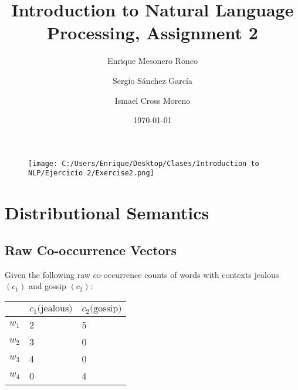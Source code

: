 \documentclass{article}
\title{ Introduction to Natural Language Processing, Assignment 2 }
\author{ Enrique Mesonero Ronco \and Sergio Sánchez García \and Ismael Cross Moreno }
\date{\today}
\begin{document}
\maketitle
\begin{figure}[h!]
	\texttt{[image: C:/Users/Enrique/Desktop/Clases/Introduction to NLP/Ejercicio 2/Exercise2.png]}
\end{figure}
\newpage
\tableofcontents
\newpage
\section { Distributional Semantics }
	\subsection { Raw Co-occurrence Vectors }
Given the following raw co-occurrence counts of words with contexts jealous
$(c_1)$ and gossip $(c_2)$:

	\begin{center}
	\begin{tabular} { | m{2cm} | m{2cm} | m{2cm} | }
		\hline
		 & $c_1 \text{(jealous)}$ &  $c_2 \text{(gossip)} $\\
		\hline
		$w_1$ & 2 & 5 \\
		\hline
		$w_2$ & 3 & 0 \\
		\hline
		$w_3$ & 4 & 0 \\
		\hline
		$w_4$ & 0 & 4 \\
		\hline
	\end{tabular}
	\end{center}
\end{document}
